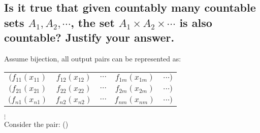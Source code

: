 \documentclass[letterpaper]{article}
\begin{document}
\subsection{Is it true that given countably many countable sets $A_1,A_2,\dotsb$, the set $A_1\times A_2\times\dotsb$ is also countable? Justify your answer.}
\begin{center}
Assume bijection, all output pairs can be represented as: \newline\newline
\begin{tabular}{c c c c c}
$(f_{11}(x_{11})$ & $f_{12}(x_{12})$ & $\dotsb$ & $f_{1m}(x_{1m})$ & $\dotsb)$ \\
$(f_{21}(x_{21})$ & $f_{22}(x_{22})$ & $\dotsb$ & $f_{2m}(x_{2m})$ & $\dotsb)$ \\
$(f_{n1}(x_{n1})$ & $f_{n2}(x_{n2})$ & $\dotsb$ & $f_{nm}(x_{nm})$ & $\dotsb)$
\end{tabular}
$\vdots$ \\
Consider the pair: ()
\end{center}
\end{document}
